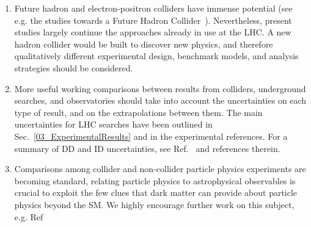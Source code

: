 \begin{issues}
\begin{enumerate}
\item Future hadron and electron-positron colliders have immense potential (see e.g. the studies towards a Future Hadron Collider~\cite{Golling:2016gvc}). Nevertheless, present studies largely continue the approaches already in use at the LHC. A new hadron collider would be built to discover new physics, and therefore qualitatively different experimental design, benchmark models, and analysis strategies should be considered.

\item More useful working comparisons between results from colliders, underground searches, and observatories should take into account the uncertainties on each type of result, and on the extrapolations between them.
  The main uncertainties for LHC searches have been outlined in Sec.~\ref{03_ExperimentalResults} and in the experimental references.
  For a summary of DD and ID uncertainties, see Ref.~\cite{Feldstein:2014ufa,d300ef23986a49099715e661295a4d72} and references therein.

\item Comparisons among collider and non-collider particle physics experiments are becoming standard, relating particle physics to astrophysical observables is crucial to exploit the few clues that dark matter can provide about particle physics beyond the SM. We highly encourage further work on this subject, e.g. Ref~\cite{Buckley:2017ijx}

\end{enumerate}
\end{issues}
